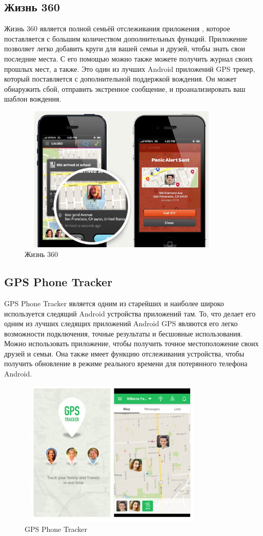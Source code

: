 \documentclass[a4paper,12pt]{article}
\begin{document}
\subsection{Жизнь 360}
Жизнь 360 является полной семьёй отслеживания приложения , которое поставляется с большим количеством дополнительных функций. Приложение позволяет легко добавить круги для вашей семьи и друзей, чтобы знать свои последние места. С его помощью можно также можете получить журнал своих прошлых мест, а также. Это один из лучших Android приложений GPS трекер, который поставляется с дополнительной поддержкой вождения. Он может обнаружить сбой, отправить экстренное сообщение, и проанализировать ваш шаблон вождения\cite{review5}.
\begin{figure}[H]
	\centering
	\includegraphics[width=10cm,height=7cm]{images/15023617296655.jpg}
	\caption{Жизнь 360}
	\label{fig:card}
\end{figure}
\subsection{GPS Phone Tracker}
GPS Phone Tracker является одним из старейших и наиболее широко используется следящий Android устройства приложений там. То, что делает его одним из лучших следящих приложений Android GPS являются его легко возможности подключения, точные результаты и бесшовные использования. Можно использовать приложение, чтобы получить точное местоположение своих друзей и семьи. Она также имеет функцию отслеживания устройства, чтобы получить обновление в режиме реального времени для потерянного телефона Android\cite{review5}.
\begin{figure}[H]
	\centering
	\includegraphics[width=9cm,height=7cm]{images/15023616915620.jpg}
	\caption{GPS Phone Tracker}
	\label{fig:card}
\end{figure}
\end{document}
